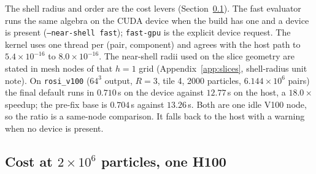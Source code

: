 The shell radius and order are the cost levers
(Section~\ref{sec:cost}). The fast evaluator runs the same algebra on the
CUDA device when the build has one and a device is present
(\texttt{--near-shell fast}); \texttt{fast-gpu} is the explicit device
request. The kernel uses one thread per (pair, component) and agrees with the
host path to $5.4\times10^{-16}$ to $8.0\times10^{-16}$. The near-shell
radii used on the slice geometry are stated in mesh nodes of that $h=1$
grid (Appendix~\ref{app:slices}, shell-radius unit note). On
\texttt{rosi\_v100} ($64^3$ output, $R=3$, tile 4, 2000 particles,
$6.144\times10^{6}$ pairs) the final default runs in $0.710$\,s on the
device against $12.77$\,s on the host, a $18.0\times$ speedup; the
pre-fix base is $0.704$\,s against $13.26$\,s. Both are one idle V100 node,
so the ratio is a same-node comparison. It falls back to the host with a
warning when no device is present.

\subsection{Cost at $2\times10^{6}$ particles, one H100}
\label{sec:cost}

\begin{table}[t]
\centering
\small
\caption{Measured CLI wall at $2\times10^{6}$ particles, $20$-cell bunch,
$66\times68\times66$, cell $2.5\times10^{-7}$\,m, tile $4$, one H100
(JURECA H100, \texttt{sm\_90}, ADIOS2-BP5, CUDA 13.4). ``near-shell
wall'' excludes the mesh, ``end-to-end wall'' includes it. The mesh-only
wall is the mesh stage of the $R=1.5$ row: $0.500$\,s of its $500.95$\,s
end-to-end wall, of which the compute is $0.083$\,s.}
\label{tab:cost}
\end{table}

